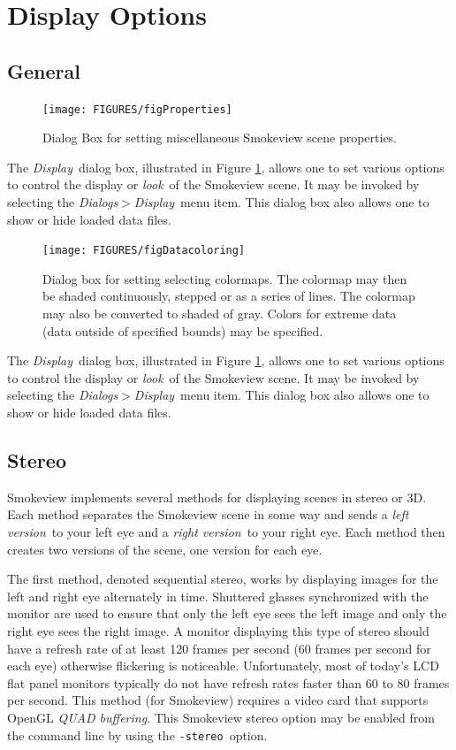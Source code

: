 \documentclass[11pt,twoside]{book}
\begin{document}
\section{Display Options}
\subsection{General}
\begin{figure}[\figoptions]
\centerline{\texttt{[image: FIGURES/figProperties]}
} \caption [Dialog Box for setting miscellaneous Smokeview scene
properties.] {Dialog Box for setting miscellaneous Smokeview scene
properties.} \label{figProperties}
\end{figure}
The {\em Display}\ dialog box, illustrated in Figure
\ref{figProperties}, allows one to set various options to control
the display or {\em look}\ of the Smokeview scene.  It may be
invoked by selecting the {\em Dialogs$>$Display}\ menu item. This
dialog box also allows one to show or hide loaded data files.

\begin{figure}[\figoptions]
\centerline{\texttt{[image: FIGURES/figDatacoloring]}
} \caption [Dialog Box for setting selecting colormaps.] {Dialog
box for setting selecting colormaps.  The colormap may then be
shaded continuously, stepped or as a series of lines.  The
colormap may also be converted to shaded of gray.  Colors for
extreme data (data outside of specified bounds) may be specified.}
\label{figDatacoloring}
\end{figure}

The {\em Display}\ dialog box, illustrated in Figure
\ref{figProperties}, allows one to set various options to control
the display or {\em look}\ of the Smokeview scene.  It may be
invoked by selecting the {\em Dialogs$>$Display}\ menu item. This
dialog box also allows one to show or hide loaded data files.

\subsection{Stereo}
\label{section:stereo} Smokeview implements several methods for displaying scenes in
stereo or 3D.  Each method separates the Smokeview scene in some
way and sends a {\em left version}\ to your left eye and a {\em
right version}\ to your right eye. Each method then creates two
versions of the scene, one version for each eye.

The first method, denoted sequential stereo, works by displaying
images for the left and right eye alternately in time.  Shuttered
glasses  synchronized with the monitor are used to ensure that
only the left eye sees the left image and only the right eye sees
the right image.  A monitor displaying this type of stereo should
have a refresh rate of at least 120 frames per second (60 frames
per second for each eye) otherwise flickering is noticeable.
Unfortunately, most of today's LCD flat panel monitors typically
do not have refresh rates faster than 60 to 80 frames per second.
This method (for Smokeview) requires a video card that supports
OpenGL {\em QUAD buffering}. This Smokeview stereo option may be
enabled from the command line by using the {\tt -stereo}\ option.
\end{document}
